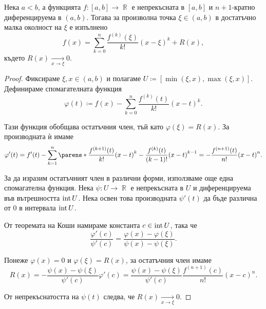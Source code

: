 \documentclass{../../common/topic}
\begin{document}
\begin{theorem}[Тейлър]
  Нека \( a < b \), а функцията \( f: [a, b] \to \BbbR \) е непрекъсната в \( [a, b] \) и \( n+1 \)-кратно диференцируема в \( (a, b) \). Тогава за произволна точка \( \xi \in (a, b) \) в достатъчно малка околност на \( \xi \) е изпълнено
  \begin{equation*}
    f(x) = \sum_{k=0}^n \frac {f^{(k)}(\xi)} {k!} {(x-\xi)}^k + R(x),
  \end{equation*}
  където \( R(x) \xrightarrow[x \to \xi]{} 0 \).
\end{theorem}
\begin{proof}
  Фиксираме \( \xi, x \in (a, b) \) и полагаме \( U \coloneqq [\min(\xi, x), \max(\xi, x)] \). Дефинираме спомагателната функция
  \begin{equation*}
    \varphi(t) \coloneqq f(x) - \sum_{k=0}^n \frac {f^{(k)}(t)} {k!} {(x-t)}^k.
  \end{equation*}

  Тази функция обобщава остатъчния член, тъй като \( \varphi(\xi) = R(x) \). За производната ѝ имаме
  \begin{equation*}
    \varphi'(t)
    =
    f'(t) -\sum_{k=1}^n \parens*{ \frac {f^{(k+1)}(t)} {k!} {(x-t)}^k - \frac {f^{(k)}(t)} {(k-1)!} {(x-t)}^{k-1} }
    =
    - \frac {f^{(n+1)}(t)} {n!} {(x-t)}^n.
  \end{equation*}

  За да изразим остатъчният член в различни форми, използваме още една спомагателна функция. Нека \( \psi: U \to \BbbR \) е непрекъсната в \( U \) и диференцируема във вътрешността \( \operatorname{int} U \). Нека освен това производната \( \psi'(t) \) да бъде различна от \( 0 \) в интервала \( \operatorname{int} U \).

  От теоремата на Коши намираме константа \( c \in \operatorname{int} U \), така че
  \begin{equation*}
    \frac {\varphi'(c)} {\psi'(c)}
    =
    \frac {\varphi(x) - \varphi(\xi)} {\psi(x) - \psi(\xi)}.
  \end{equation*}

  Понеже \( \varphi(x) = 0 \) и \( \varphi(\xi) = R(x) \), за остатъчния член имаме
  \begin{equation*}
    R(x)
    =
    -\frac {\psi(x) - \psi(\xi)} {\psi'(c)} \varphi'(c)
    =
    \frac {\psi(x) - \psi(\xi)} {\psi'(c)} \frac {f^{(n+1)}(c)} {n!} {(x-c)}^n.
  \end{equation*}

  От непрекъснатостта на \( \psi(t) \) следва, че \( R(x) \xrightarrow[x \to \xi]{} 0 \).
\end{proof}
\end{document}
